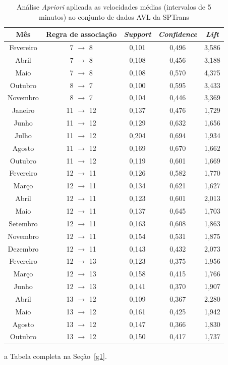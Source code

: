 \documentclass[
	12pt,				%
	oneside,			%
	a4paper,			%
	english,			%
	brazil				%
	]{abntex2ppgsi}
\begin{document}
{{\begin{table}[!htb]
\centering
\begin{threeparttable}
\caption {Análise \textit{Apriori} aplicada as velocidades médias (intervalos de 5 minutos) ao conjunto de dados AVL da SPTrans}
\label {tab:aprioriFull}
\begin{tabular}{c|c|c|c|c}
\toprule
\textbf{Mês} & \textbf{Regra de associação} & \textit{\textbf{Support}} & \textit{\textbf{Confidence}} & \textit{\textbf{Lift}} \\
\midrule
Fevereiro & 7 $\rightarrow$ 8 & 0,101 & 0,496 & 3,586\\
Abril & 7 $\rightarrow$ 8  & 0,108 & 0,456 & 3,188\\
Maio & 7 $\rightarrow$ 8 & 0,108 & 0,570 & 4,375\\
\midrule
Outubro & 8 $\rightarrow$ 7 & 0,100 & 0,595 & 3,433\\
Novembro & 8 $\rightarrow$ 7 & 0,104 & 0,446 & 3,369\\
\midrule
Janeiro & 11 $\rightarrow$ 12 & 0,137 & 0,476 & 1,729 \\
Junho & 11 $\rightarrow$ 12 & 0,129 & 0,632 & 1,656\\
Julho & 11 $\rightarrow$ 12 & 0,204 & 0,694 & 1,934\\
Agosto & 11 $\rightarrow$ 12 & 0,169 & 0,670 & 1,662\\
Outubro & 11 $\rightarrow$ 12 & 0,119 & 0,601 & 1,669\\
\midrule
Fevereiro & 12 $\rightarrow$ 11 & 0,126 & 0,582 & 1,770\\
Março & 12 $\rightarrow$ 11 & 0,134 & 0,621 & 1,627\\
Abril & 12 $\rightarrow$ 11 & 0,123 & 0,601 & 2,013\\
Maio & 12 $\rightarrow$ 11 & 0,137 & 0,645 & 1,703\\
Setembro & 12 $\rightarrow$ 11 & 0,163 & 0,608 & 1,863\\
Novembro & 12 $\rightarrow$ 11 & 0,154 & 0,531 & 1,875\\
Dezembro & 12 $\rightarrow$ 11 & 0,143 & 0,432 & 2,073\\
\midrule
Fevereiro & 12 $\rightarrow$ 13 & 0,123 & 0,375 & 1,956\\
Março & 12 $\rightarrow$ 13 & 0,158 & 0,415 & 1,766\\
Junho & 12 $\rightarrow$ 13 & 0,141 & 0,370 & 1,907\\
\midrule
Abril  & 13 $\rightarrow$ 12 & 0,109 & 0,367 & 2,280\\
Maio & 13 $\rightarrow$ 12 & 0,161 & 0,425 & 1,942\\
Agosto & 13 $\rightarrow$ 12 & 0,147 & 0,366 & 1,830\\
Outubro & 13 $\rightarrow$ 12 & 0,150 & 0,417 & 1,737\\
\bottomrule
\end{tabular}
\begin{tablenotes}
            \item[a] Tabela completa na Seção~\ref{g1}.
        \end{tablenotes}
\end{threeparttable}
\end{table}

}}
\end{document}
